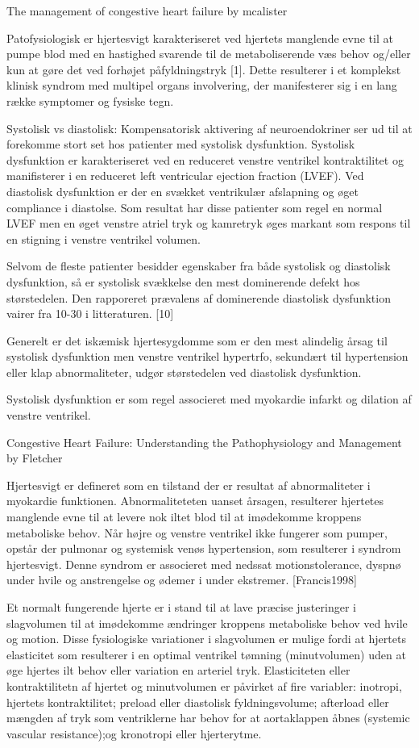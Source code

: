 The management of congestive heart failure by mcalister

Patofysiologisk er hjertesvigt karakteriseret ved hjertets manglende evne til at pumpe blod med en hastighed svarende til de metaboliserende væs behov og/eller kun at gøre det ved forhøjet påfyldningstryk [1]. Dette resulterer i et komplekst klinisk syndrom med multipel organs involvering, der manifesterer sig i en lang række symptomer og fysiske tegn.

Systolisk vs diastolisk:
Kompensatorisk aktivering af neuroendokriner ser ud til at forekomme stort set hos patienter med systolisk dysfunktion. Systolisk dysfunktion er karakteriseret ved en reduceret venstre ventrikel kontraktilitet og manifisterer i en reduceret left ventricular ejection fraction (LVEF). Ved diastolisk dysfunktion er der en svækket ventrikulær afslapning og øget compliance i diastolse. Som resultat har disse patienter som regel en normal LVEF men en øget venstre atriel tryk og kamretryk øges markant som respons til en stigning i venstre ventrikel volumen. 

Selvom de fleste patienter besidder egenskaber fra både systolisk og diastolisk dysfunktion, så er systolisk svækkelse den mest dominerende defekt hos størstedelen. Den rapporeret prævalens af dominerende diastolisk dysfunktion vairer fra 10-30 i litteraturen. [10] 

Generelt er det iskæmisk hjertesygdomme som er den mest alindelig årsag til systolisk dysfunktion men venstre ventrikel hypertrfo, sekundært til hypertension eller klap abnormaliteter, udgør størstedelen ved diastolisk dysfunktion.  

Systolisk dysfunktion er som regel associeret med myokardie infarkt og dilation af venstre ventrikel. 

Congestive Heart Failure: Understanding the Pathophysiology and Management by Fletcher


Hjertesvigt er defineret som en tilstand der er resultat af abnormaliteter i myokardie funktionen. Abnormaliteteten uanset årsagen, resulterer hjertetes manglende evne til at levere nok iltet blod til at imødekomme kroppens metaboliske behov. Når højre og venstre ventrikel ikke fungerer som pumper, opstår der pulmonar og systemisk venøs hypertension, som resulterer i syndrom hjertesvigt. Denne syndrom er associeret med nedssat motionstolerance, dyspnø under hvile og anstrengelse og ødemer i under ekstremer. [Francis1998]

Et normalt fungerende hjerte er i stand til at lave præcise justeringer i slagvolumen til at imødekomme ændringer kroppens metaboliske behov ved hvile og motion. Disse fysiologiske variationer i slagvolumen er mulige fordi at hjertets elasticitet som resulterer i en optimal ventrikel tømning (minutvolumen) uden at øge hjertes ilt behov eller variation en arteriel tryk. Elasticiteten eller kontraktilitetn af hjertet og minutvolumen er påvirket af fire variabler: inotropi, hjertets kontraktilitet; preload eller diastolisk fyldningsvolume; afterload eller mængden af tryk som ventriklerne har behov for at aortaklappen åbnes (systemic vascular resistance);og kronotropi eller hjerterytme.  

